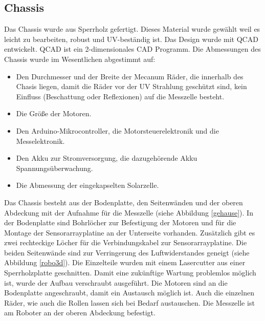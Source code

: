 \documentclass[a4paper,bibtotoc,oneside]{scrbook}
\begin{document}
\subsection{Chassis}\thispagestyle{empty}

\noindent Das Chassis wurde aus Sperrholz gefertigt. Dieses Material wurde gewählt weil es leicht zu bearbeiten, robust und UV-beständig ist. Das Design wurde mit QCAD \cite{qc} entwickelt. QCAD ist ein 2-dimensionales CAD Programm. 
Die Abmessungen des Chassis wurde im Wesentlichen abgestimmt auf: \begin{itemize}
\item Den Durchmesser und der Breite der Mecanum Räder, die innerhalb des Chasis liegen, damit die Räder vor der UV Strahlung geschützt sind, kein Einfluss (Beschattung oder Reflexionen) auf die Messzelle besteht.
\item Die Größe der Motoren.
\item Den Arduino-Mikrocontroller, die Motorsteuerelektronik und die Messelektronik.
\item Den Akku zur Stromversorgung, die dazugehörende Akku Spannungsüberwachung.
\item Die Abmessung der eingekapselten Solarzelle.
 \end{itemize}

Das Chassis besteht aus der Bodenplatte, den Seitenwänden und der oberen Abdeckung mit der Aufnahme für die Messzelle (siehe Abbildung \ref{gehause}). In der Bodenplatte sind Bohrlöcher zur Befestigung der Motoren und für die Montage der Sensorarrayplatine an der Unterseite vorhanden. Zusätzlich gibt es zwei rechteckige Löcher für die Verbindungskabel zur Sensorarrayplatine. Die beiden Seitenwände sind zur Verringerung des Luftwiderstandes geneigt (siehe Abbildung \ref{robo3d}).
\noindent Die Einzelteile wurden mit einem Lasercutter aus einer Sperrholzplatte geschnitten. Damit eine zukünftige Wartung problemlos möglich ist, wurde der Aufbau verschraubt ausgeführt. 
Die Motoren sind an die Bodenplatte angeschraubt, damit ein Austausch möglich ist. Auch die einzelnen Räder, wie auch die Rollen lassen sich bei Bedarf austauschen. 
Die Messzelle ist am Roboter an der oberen Abdeckung befestigt.
\end{document}

